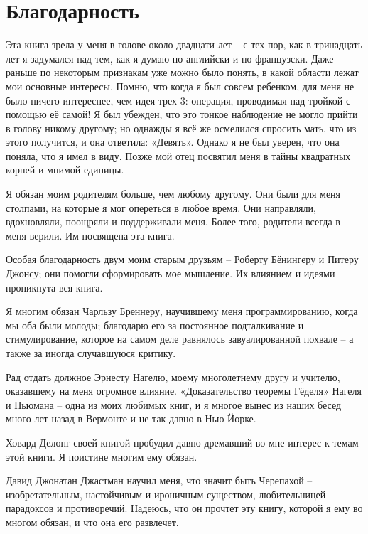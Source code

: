 \documentclass[../main.tex]{subfiles}
\begin{document}

\chapter{Благодарность}

Эта книга зрела у меня в голове около двадцати лет \--- с тех пор, как в тринадцать лет я задумался над тем, как я думаю по-английски и по-французски. Даже раньше по некоторым признакам уже можно было понять, в какой области лежат мои основные интересы. Помню, что когда я был совсем ребенком, для меня не было ничего интереснее, чем идея трех 3: операция, проводимая над тройкой с помощью её самой! Я был убежден, что это тонкое наблюдение не могло прийти в голову никому другому; но однажды я всё же осмелился спросить мать, что из этого получится, и она ответила: «Девять». Однако я не был уверен, что она поняла, что я имел в виду. Позже мой отец посвятил меня в тайны квадратных корней и мнимой единицы.

Я обязан моим родителям больше, чем любому другому. Они были для меня столпами, на которые я мог опереться в любое время. Они направляли, вдохновляли, поощряли и поддерживали меня. Более того, родители всегда в меня верили. Им посвящена эта книга.

Особая благодарность двум моим старым друзьям \--- Роберту Бёнингеру и Питеру Джонсу; они помогли сформировать мое мышление. Их влиянием и идеями проникнута вся книга.

Я многим обязан Чарльзу Бреннеру, научившему меня программированию, когда мы оба были молоды; благодарю его за постоянное подталкивание и стимулирование, которое на самом деле равнялось завуалированной похвале \--- а также за иногда случавшуюся критику.

Рад отдать должное Эрнесту Нагелю, моему многолетнему другу и учителю, оказавшему на меня огромное влияние. «Доказательство теоремы Гёделя» Нагеля и Ньюмана \--- одна из моих любимых книг, и я многое вынес из наших бесед много лет назад в Вермонте и не так давно в Нью-Йорке.

Ховард Делонг своей книгой пробудил давно дремавший во мне интерес к темам этой книги. Я поистине многим ему обязан.

Давид Джонатан Джастман научил меня, что значит быть Черепахой \--- изобретательным, настойчивым и ироничным существом, любительницей парадоксов и противоречий. Надеюсь, что он прочтет эту книгу, которой я ему во многом обязан, и что она его развлечет.
\end{document}
